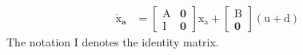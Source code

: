 \documentclass[peerreview]{IEEEtran}
\begin{document}
\begin{equation}\label{systemlqidg}
	\begin{split}
		\boldsymbol{\dot{\mathrm{x}}_a} &= \begin{bmatrix}
			\boldsymbol{\mathrm{A}} & \boldsymbol{0}\\
			\boldsymbol{\mathrm{I}} & \boldsymbol{0}
		\end{bmatrix}\boldsymbol{\mathrm{x_a}} + \begin{bmatrix}
			\boldsymbol{\mathrm{B}}\\
			\boldsymbol{0}
		\end{bmatrix}
		 \left(\boldsymbol{\mathrm{u}} + \boldsymbol{\mathrm{d}}\right)%
	\end{split}
\end{equation}
The notation $\boldsymbol{\mathrm{I}}$ denotes the identity matrix.
\end{document}

